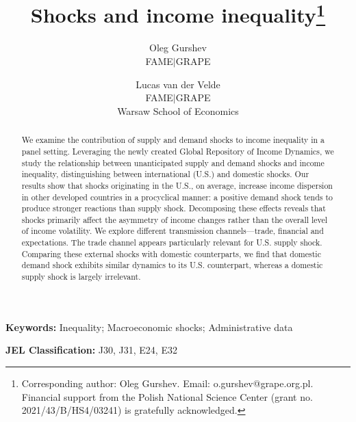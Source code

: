 \documentclass[12pt, a4paper]{article}
\title{Shocks and income inequality\thanks{Corresponding author: Oleg Gurshev. Email: o.gurshev@grape.org.pl.\\Financial support from the Polish National Science Center (grant no. 2021/43/B/HS4/03241) is gratefully acknowledged.}}%
\author{
    Oleg Gurshev  \\ 
    \small{FAME$\mid$GRAPE} 
    \and 
    Lucas van der Velde \\ 
    \small{FAME$\mid$GRAPE} \\[-0.5em] 
    \small{Warsaw School of Economics}
}
\date{}
\begin{document}
\maketitle
\thispagestyle{empty}
\begin{abstract}
\noindent 
We examine the contribution of supply and demand shocks to income inequality in a panel setting. Leveraging the newly created Global Repository of Income Dynamics, we study the relationship between unanticipated supply and demand shocks and income inequality, distinguishing between international (U.S.) and domestic shocks. Our results show that shocks originating in the U.S., on average, increase income dispersion in other developed countries in a procyclical manner: a positive demand shock tends to produce stronger reactions than supply shock. Decomposing these effects reveals that shocks primarily affect the asymmetry of income changes rather than the overall level of income volatility. We explore different transmission channels—trade, financial and expectations. The trade channel appears particularly relevant for U.S. supply shock. Comparing these external shocks with domestic counterparts, we find that domestic demand shock exhibits similar dynamics to its U.S. counterpart, whereas a domestic supply shock is largely irrelevant.
\end{abstract}

\bigskip
\hspace*{15pt}\textbf{Keywords:} Inequality; Macroeconomic shocks; Administrative data
 
\hspace*{15pt}\textbf{JEL Classification:} J30, J31, E24, E32
\clearpage



\end{document}
